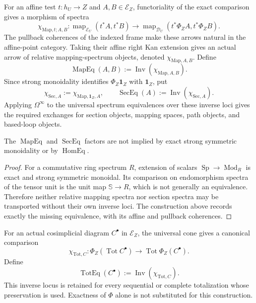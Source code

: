 \begin{construction}
\label{constr:prequantum-map-section-exchange-realization}
For an affine test $t:h_U\to Z$ and $A,B\in\mathcal E_Z$, functoriality of the
exact comparison gives a morphism of spectra
\[
\chi_{\mathrm{Map},t;A,B}:
\operatorname{map}_{\mathcal E_U}(t^*A,t^*B)
\longrightarrow
\operatorname{map}_{\mathcal D_U}
(t^*\Phi_ZA,t^*\Phi_ZB).
\]
The pullback coherences of the indexed frame make these arrows natural in the
affine-point category.  Taking their affine right Kan extension gives an actual
arrow of relative mapping-spectrum objects, denoted
$\chi_{\mathrm{Map},A,B}$.  Define
\[
\boxed{
\operatorname{MapEq}(A,B)
:=
\operatorname{Inv}(\chi_{\mathrm{Map},A,B}).
}
\]
Since strong monoidality identifies $\Phi_Z\mathbf1_Z$ with $\mathbf1_Z$, put
\[
\chi_{\mathrm{Sec},A}:=\chi_{\mathrm{Map},\mathbf1_Z,A},
\qquad
\boxed{
\operatorname{SecEq}(A):=
\operatorname{Inv}(\chi_{\mathrm{Sec},A}).
}
\]
Applying $\Omega^\infty$ to the universal spectrum equivalences over these
inverse loci gives the required exchanges for section objects, mapping spaces,
path objects, and based-loop objects.
\end{construction}

\begin{proposition}
\label{prop:prequantum-map-exchange-necessary}
The $\operatorname{MapEq}$ and $\operatorname{SecEq}$ factors are not implied
by exact strong symmetric monoidality or by $\operatorname{HomEq}$.
\end{proposition}

\begin{proof}
For a commutative ring spectrum $R$, extension of scalars
$\operatorname{Sp}\to\operatorname{Mod}_R$ is exact and strong symmetric
monoidal.  Its comparison on endomorphism spectra of the tensor unit is the unit
map $\mathbb S\to R$, which is not generally an equivalence.  Therefore neither
relative mapping spectra nor section spectra may be transported without their
own inverse loci.  The construction above records exactly the missing
equivalence, with its affine and pullback coherences.
\end{proof}

\begin{construction}
\label{constr:prequantum-totalization-exchange-realization}
For an actual cosimplicial diagram $C^\bullet$ in $\mathcal E_Z$, the universal
cone gives a canonical comparison
\[
\boxed{
\chi_{\mathrm{Tot},C}:
\Phi_Z(\operatorname{Tot}C^\bullet)
\longrightarrow
\operatorname{Tot}\Phi_Z(C^\bullet).
}
\]
Define
\[
\boxed{
\operatorname{TotEq}(C^\bullet)
:=
\operatorname{Inv}(\chi_{\mathrm{Tot},C}).
}
\]
This inverse locus is retained for every sequential or complete totalization
whose preservation is used.  Exactness of $\Phi$ alone is not substituted for
this construction.
\end{construction}

